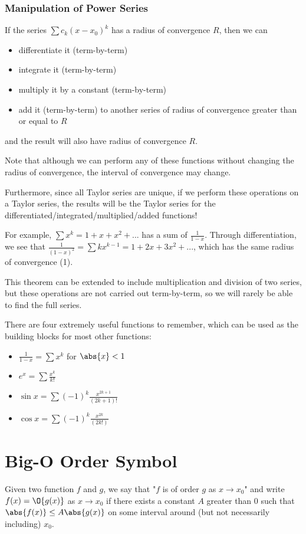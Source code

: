 \documentclass[12pt]{article}
\begin{document}
\subsubsection*{Manipulation of Power Series}
If the series $\sum c_k (x-x_0)^k$ has a radius of convergence $R$, then we can
\begin{itemize}
\item differentiate it (term-by-term)
\item integrate it (term-by-term)
\item multiply it by a constant (term-by-term)
\item add it (term-by-term) to another series of radius of convergence greater than or equal to $R$
\end{itemize}
and the result will also have radius of convergence $R$.

Note that although we can perform any of these functions without changing the radius of convergence, the interval of convergence may change.

Furthermore, since all Taylor series are unique, if we perform these operations on a Taylor series, the results will be the Taylor series for the differentiated/integrated/multiplied/added functions!

For example, $\sum x^k = 1 + x + x^2 + ...$ has a sum of $\frac{1}{1-x}$. Through differentiation, we see that $\frac{1}{(1-x)^2} = \sum kx^{k-1} = 1 + 2x + 3x^2 + ...$, which has the same radius of convergence (1).

This theorem can be extended to include multiplication and division of two series, but these operations are not carried out term-by-term, so we will rarely be able to find the full series.

There are four extremely useful functions to remember, which can be used as the building blocks for most other functions:
\begin{itemize}
\item $\frac{1}{1-x} = \sum x^k$ for $\abs{x} < 1$
\item $e^x = \sum \frac{x^k}{k!}$
\item $\sin x = \sum (-1)^k \frac{x^{2k+1}}{(2k+1)!}$
\item $\cos x = \sum (-1)^k \frac{x^{2k}}{(2k!)}$
\end{itemize}

\section*{Big-O Order Symbol}
 Given two function $f$ and $g$, we say that "$f$ is of order $g$ as $x \to x_0$" and write $f(x) = \O{g(x)}$ as $x \to x_0$ if there exists a constant $A$ greater than 0 such that $\abs{f(x)} \leq A \abs{g(x)}$ on some interval around (but not necessarily including) $x_0$.
\end{document}
